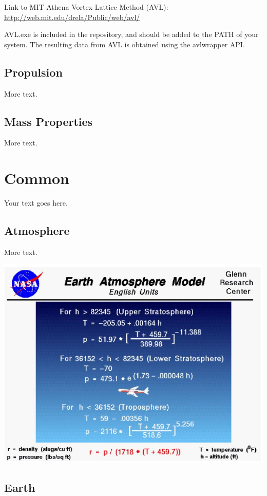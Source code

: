 \documentclass[11pt]{article} %
\begin{document}
Link to MIT Athena Vortex Lattice Method (AVL): \\
\url{http://web.mit.edu/drela/Public/web/avl/}

AVL.exe is included in the repository, and should be added to the PATH of your system. The resulting data from AVL is obtained using the avlwrapper API. 

\subsection{Propulsion}

More text.

\subsection{Mass Properties}

More text.

\section{Common}

Your text goes here.

\subsection{Atmosphere}

More text.
\begin{center}
    \includegraphics[width=1\textwidth]{atmosphere}
\end{center}

\subsection{Earth}
\end{document}

